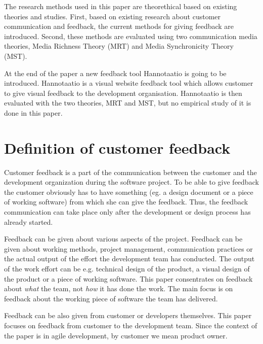 \documentclass[conference]{IEEEtran}
\begin{document}
The research methods used in this paper are theorethical based on existing theories and studies. First, based on existing research about customer communication and feedback, the current methods for giving feedback are introduced. Second, these methods are evaluated using two communication media theories, Media Richness Theory (MRT) and Media Synchronicity Theory (MST).

At the end of the paper a new feedback tool Hannotaatio is going to be introduced. Hannotaatio is a visual website feedback tool which allows customer to give visual feedback to the development organisation. Hannotaatio is then evaluated with the two theories, MRT and MST, but no empirical study of it is done in this paper.



\section{Definition of customer feedback}


Customer feedback is a part of the communication between the customer and the development organization during the software project. To be able to give feedback the customer obviously has to have something (eg. a design document or a piece of working software) from which she can give the feedback. Thus, the feedback communication can take place only after the development or design process has already started.

Feedback can be given about various aspects of the project. Feedback can be given about working methods, project management, communication practices or the actual output of the effort the development team has conducted. The output of the work effort can be e.g. technical design of the product, a visual design of the product or a piece of working software. This paper consentrates on feedback about \textit{what} the team, not \textit{how} it has done the work. The main focus is on feedback about the working piece of software the team has delivered.

Feedback can be also given from customer or developers themselves. This paper focuses on feedback from customer to the development team. Since the context of the paper is in agile development, by customer we mean product owner.
\end{document}
